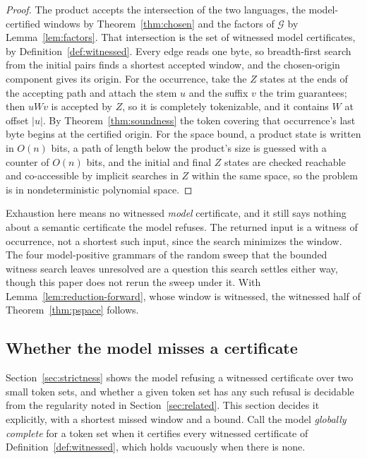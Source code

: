 \documentclass[11pt,a4paper]{article}
\theoremstyle{definition}
\theoremstyle{plain}
\begin{document}
\begin{proof}
The product accepts the intersection of the two languages, the model-certified windows by Theorem~\ref{thm:chosen} and
the factors of $\mathcal{G}$ by Lemma~\ref{lem:factors}. That intersection is the set of witnessed model certificates,
by Definition~\ref{def:witnessed}. Every edge reads one byte, so breadth-first search from the initial pairs finds a
shortest accepted window, and the chosen-origin component gives its origin. For the occurrence, take the $Z$ states at
the ends of the accepting path and attach the stem $u$ and the suffix $v$ the trim guarantees; then $u W v$ is accepted
by $Z$, so it is completely tokenizable, and it contains $W$ at offset $|u|$. By Theorem~\ref{thm:soundness} the token
covering that occurrence's last byte begins at the certified origin. For the space bound, a product state is written in
$O(n)$ bits, a path of length below the product's size is guessed with a counter of $O(n)$ bits, and the initial and
final $Z$ states are checked reachable and co-accessible by implicit searches in $Z$ within the same space, so the
problem is in nondeterministic polynomial space.
\end{proof}

Exhaustion here means no witnessed \emph{model} certificate, and it still says nothing about a semantic certificate the
model refuses. The returned input is a witness of occurrence, not a shortest such input, since the search minimizes the
window. The four model-positive grammars of the random sweep that the bounded witness search leaves unresolved are a
question this search settles either way, though this paper does not rerun the sweep under it. With
Lemma~\ref{lem:reduction-forward}, whose window is witnessed, the witnessed half of Theorem~\ref{thm:pspace} follows.

\subsection{Whether the model misses a certificate}
\label{sec:completeness}

Section~\ref{sec:strictness} shows the model refusing a witnessed certificate over two small token sets, and whether a
given token set has any such refusal is decidable from the regularity noted in Section~\ref{sec:related}. This section
decides it explicitly, with a shortest missed window and a bound. Call the model \emph{globally complete} for a token
set when it certifies every witnessed certificate of Definition~\ref{def:witnessed}, which holds vacuously when there is
none.
\end{document}

